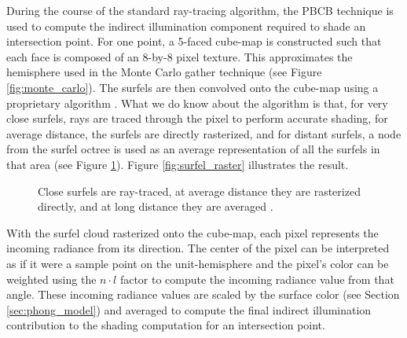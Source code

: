 During the course of the standard ray-tracing algorithm, the PBCB technique is used to compute the indirect illumination component required to shade an intersection point. For one point, a 5-faced cube-map is constructed such that each face is composed of an 8-by-8 pixel texture. This approximates the hemisphere used in the Monte Carlo gather technique (see Figure \ref{fig:monte_carlo}). The surfels are then convolved onto the cube-map using a proprietary algorithm \cite{bib:christensen2008}. What we do know about the algorithm is that, for very close surfels, rays are traced through the pixel to perform accurate shading, for average distance, the surfels are directly rasterized, and for distant surfels, a node from the surfel octree is used as an average representation of all the surfels in that area (see Figure \ref{fig:3_level_surfel}). Figure \ref{fig:surfel_raster} illustrates the result.

\begin{figure}
    \centering
    \caption[3 levels of surfel fidelity]{Close surfels are ray-traced, at average distance they are rasterized directly, and at long distance they are averaged \cite{bib:christensen_slides}.}
    \label{fig:3_level_surfel}
\end{figure}


With the surfel cloud rasterized onto the cube-map, each pixel represents the incoming radiance from its direction. The center of the pixel can be interpreted as if it were a sample point on the unit-hemisphere and the pixel's color can be weighted using the $n \cdot l$ factor to compute the incoming radiance value from that angle. These incoming radiance values are scaled by the surface color (see Section \ref{sec:phong_model}) and averaged to compute the final indirect illumination contribution to the shading computation for an intersection point.

